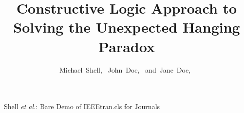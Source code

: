 \documentclass[journal]{journal}
\begin{document}
%
\title{Constructive Logic Approach to Solving the Unexpected Hanging Paradox}
%
%
%

\author{Michael~Shell,~
        John~Doe,~
        and~Jane~Doe,~}%

%
%



%
{Shell \MakeLowercase{\textit{et al.}}: Bare Demo of IEEEtran.cls for Journals}
%
\end{document}
